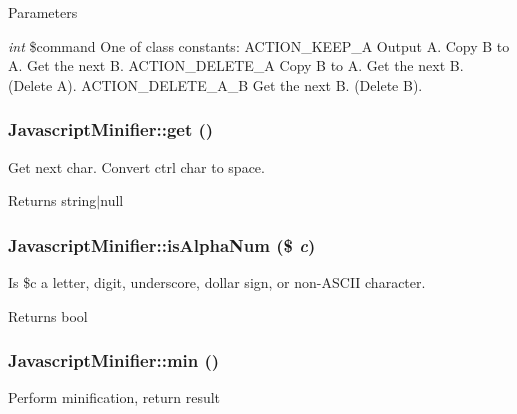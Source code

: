 \begin{DoxyParams}{Parameters}
\item[{\em int}]\$command One of class constants: ACTION\_\-KEEP\_\-A Output A. Copy B to A. Get the next B. ACTION\_\-DELETE\_\-A Copy B to A. Get the next B. (Delete A). ACTION\_\-DELETE\_\-A\_\-B Get the next B. (Delete B). \end{DoxyParams}
\hypertarget{classJavascriptMinifier_ae7e2ae85b89dcd36f10c8298cc5c8749}{
\subsubsection[{get}]{\setlength{\rightskip}{0pt plus 5cm}JavascriptMinifier::get ()}}
\label{classJavascriptMinifier_ae7e2ae85b89dcd36f10c8298cc5c8749}
Get next char. Convert ctrl char to space.

\begin{DoxyReturn}{Returns}
string$|$null 
\end{DoxyReturn}
\hypertarget{classJavascriptMinifier_a0a745cbf92ba3dd748b736b1f20abd87}{
\subsubsection[{isAlphaNum}]{\setlength{\rightskip}{0pt plus 5cm}JavascriptMinifier::isAlphaNum (\$ {\em c})}}
\label{classJavascriptMinifier_a0a745cbf92ba3dd748b736b1f20abd87}
Is \$c a letter, digit, underscore, dollar sign, or non-\/ASCII character.

\begin{DoxyReturn}{Returns}
bool 
\end{DoxyReturn}
\hypertarget{classJavascriptMinifier_a67114eb8f254e1765a79ba839e979715}{
\subsubsection[{min}]{\setlength{\rightskip}{0pt plus 5cm}JavascriptMinifier::min ()}}
\label{classJavascriptMinifier_a67114eb8f254e1765a79ba839e979715}
Perform minification, return result

